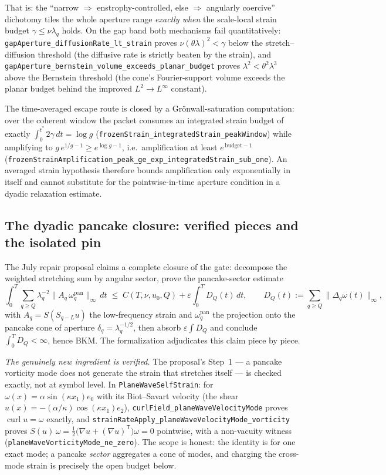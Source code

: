 \documentclass[11pt]{article}
\theoremstyle{definition}
\begin{document}
That is: the ``narrow $\Rightarrow$ enstrophy-controlled, else
$\Rightarrow$ angularly coercive'' dichotomy tiles the whole aperture range
\emph{exactly when} the scale-local strain budget $\gamma\le\nu\lambda_q$
holds.  On the gap band both mechanisms fail quantitatively:
\texttt{gapAperture\_diffusionRate\_lt\_strain} proves
$\nu(\theta\lambda)^2<\gamma$ below the stretch--diffusion threshold (the
diffusive rate is strictly beaten by the strain), and
\texttt{gapAperture\_bernstein\_volume\_exceeds\_planar\_budget} proves
$\lambda^2<\theta^2\lambda^3$ above the Bernstein threshold (the cone's
Fourier-support volume exceeds the planar budget behind the improved
$L^2\to L^\infty$ constant).

The time-averaged escape route is closed by a Gr\"onwall-saturation
computation: over the coherent window the packet consumes an integrated
strain budget of exactly $\int_0^{t^*}2\gamma\,dt=\log g$
(\texttt{frozenStrain\_integratedStrain\_peakWindow}) while amplifying to
$g\,e^{1/g-1}\ge e^{\log g-1}$, i.e.\ amplification at least
$e^{\,\mathrm{budget}-1}$
(\texttt{frozenStrainAmplification\_peak\_ge\_exp\_integratedStrain\_sub\_one}).
An averaged strain hypothesis therefore bounds amplification only
exponentially in itself and cannot substitute for the pointwise-in-time
aperture condition in a dyadic relaxation estimate.

\subsection{The dyadic pancake closure: verified pieces and the isolated pin}
\label{sec:pancake}

The July repair proposal claims a complete closure of the gate: decompose the
weighted stretching sum by angular sector, prove the pancake-sector estimate
\[
  \int_0^T \sum_{q\ge Q}\lambda_q^{-2}
    \bigl\|A_q\,\omega_q^{\mathrm{pan}}\bigr\|_\infty\,dt
  \;\le\; C(T,\nu,u_0,Q) + \varepsilon\int_0^T D_Q(t)\,dt,
  \qquad
  D_Q(t):=\sum_{q\ge Q}\|\Delta_q\omega(t)\|_\infty,
\]
with $A_q=S(S_{q-L}u)$ the low-frequency strain and
$\omega_q^{\mathrm{pan}}$ the projection onto the pancake cone of aperture
$\delta_q=\lambda_q^{-1/2}$, then absorb $\varepsilon\int D_Q$ and conclude
$\int_0^T D_Q<\infty$, hence BKM.  The formalization adjudicates this claim
piece by piece.

\emph{The genuinely new ingredient is verified.}  The proposal's Step~1 --- a
pancake vorticity mode does not generate the strain that stretches itself ---
is checked exactly, not at symbol level.  In \texttt{PlaneWaveSelfStrain}:
for $\omega(x)=\alpha\sin(\kappa x_1)e_0$ with its Biot--Savart velocity (the
shear $u(x)=-(\alpha/\kappa)\cos(\kappa x_1)e_2$),
\texttt{curlField\_planeWaveVelocityMode} proves
$\operatorname{curl}u=\omega$ exactly, and
\texttt{strainRateApply\_planeWaveVelocityMode\_vorticity} proves
$S(u)\,\omega = \tfrac12\bigl(\nabla u+(\nabla u)^{\mathsf T}\bigr)\omega=0$
pointwise, with a non-vacuity witness
(\texttt{planeWaveVorticityMode\_ne\_zero}).  The scope is honest: the
identity is for one exact mode; a pancake \emph{sector} aggregates a cone of
modes, and charging the cross-mode strain is precisely the open budget below.
\end{document}
